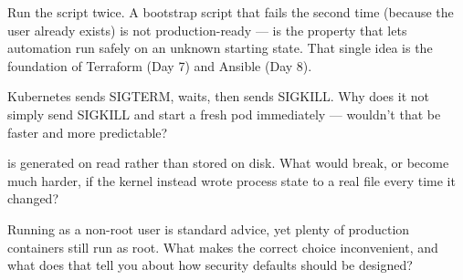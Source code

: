 \begin{prodtip}
Run the script twice. A bootstrap script that fails the second time (because the user already exists) is not production-ready ---  is the property that lets automation run safely on an unknown starting state. That single idea is the foundation of Terraform (Day 7) and Ansible (Day 8).
\end{prodtip}


\begin{thinkbox}
Kubernetes sends SIGTERM, waits, then sends SIGKILL. Why does it not simply send SIGKILL and start a fresh pod immediately --- wouldn't that be faster and more predictable?
\end{thinkbox}

\begin{thinkbox}
 is generated on read rather than stored on disk. What would break, or become much harder, if the kernel instead wrote process state to a real file every time it changed?
\end{thinkbox}

\begin{thinkbox}
Running as a non-root user is standard advice, yet plenty of production containers still run as root. What makes the correct choice inconvenient, and what does that tell you about how security defaults should be designed?
\end{thinkbox}


